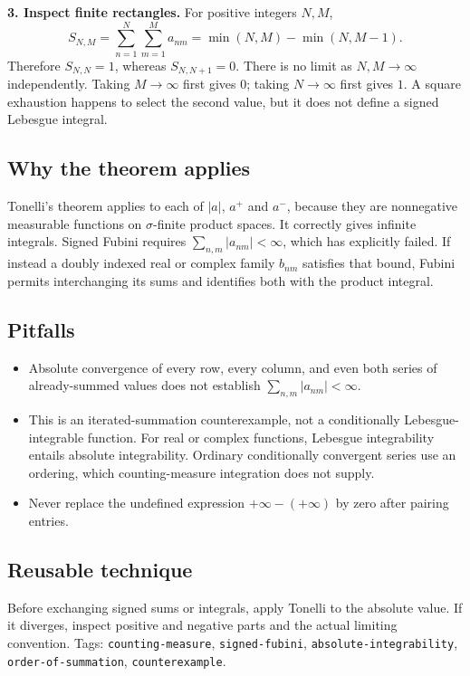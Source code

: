 \documentclass[
  11pt,
]{article}
\providecommand{\tightlist}{%
  \setlength{\itemsep}{0pt}\setlength{\parskip}{0pt}}
\begin{document}
\textbf{3. Inspect finite rectangles.} For positive integers \(N,M\), \[
S_{N,M}=\sum_{n=1}^{N}\sum_{m=1}^{M}a_{nm}
=\min(N,M)-\min(N,M-1).
\] Therefore \(S_{N,N}=1\), whereas \(S_{N,N+1}=0\). There is no limit
as \(N,M\to\infty\) independently. Taking \(M\to\infty\) first gives
\(0\); taking \(N\to\infty\) first gives \(1\). A square exhaustion
happens to select the second value, but it does not define a signed
Lebesgue integral.

\subsection{Why the theorem applies}\label{why-the-theorem-applies-4}

Tonelli's theorem applies to each of \(|a|\), \(a^+\) and \(a^-\),
because they are nonnegative measurable functions on \(\sigma\)-finite
product spaces. It correctly gives infinite integrals. Signed Fubini
requires \(\sum_{n,m}|a_{nm}|<\infty\), which has explicitly failed. If
instead a doubly indexed real or complex family \(b_{nm}\) satisfies
that bound, Fubini permits interchanging its sums and identifies both
with the product integral.

\subsection{Pitfalls}\label{pitfalls-4}

\begin{itemize}
\tightlist
\item
  Absolute convergence of every row, every column, and even both series
  of already-summed values does not establish
  \(\sum_{n,m}|a_{nm}|<\infty\).
\item
  This is an iterated-summation counterexample, not a conditionally
  Lebesgue-integrable function. For real or complex functions, Lebesgue
  integrability entails absolute integrability. Ordinary conditionally
  convergent series use an ordering, which counting-measure integration
  does not supply.
\item
  Never replace the undefined expression \(+\infty-(+\infty)\) by zero
  after pairing entries.
\end{itemize}

\subsection{Reusable technique}\label{reusable-technique-4}

Before exchanging signed sums or integrals, apply Tonelli to the
absolute value. If it diverges, inspect positive and negative parts and
the actual limiting convention. Tags: \texttt{counting-\allowbreak{}measure},
\texttt{signed-\allowbreak{}fubini}, \texttt{absolute-\allowbreak{}integrability},
\texttt{order-\allowbreak{}of-\allowbreak{}summation}, \texttt{counterexample}.
\end{document}
